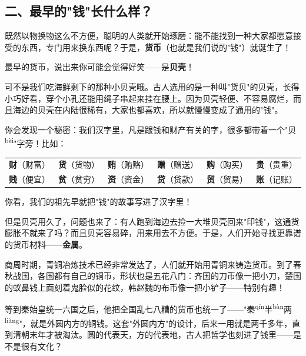 \documentclass[a4paper,12pt]{ctexart}
\newcommand{\ruby}[2]{#1\textsuperscript{#2}}
\begin{document}
\subsection*{二、最早的"钱"长什么样？}

既然以物换物这么不方便，聪明的人类就开始琢磨：能不能找到一种大家都愿意接受的东西，专门用来换东西呢？于是，\textbf{货币}（也就是我们说的"钱"）就诞生了！

最早的货币，说出来你可能会觉得好笑——是\textbf{贝壳}！

可不是我们吃海鲜剩下的那种小贝壳哦。古人选用的是一种叫"货贝"的贝壳，长得小巧好看，穿个小孔还能用绳子串起来挂在腰上。因为贝壳轻便、不容易腐烂，而且海边的贝壳在内陆很稀有，大家也都喜欢，所以就慢慢变成了通用的"钱"。

你会发现一个秘密：我们汉字里，凡是跟钱和财产有关的字，很多都带着一个"\ruby{贝}{bèi}"字旁！比如：

\begin{center}
\begin{tabular}{cccccc}
\textbf{财}（财富）& \textbf{货}（货物）& \textbf{贿}（贿赂）& \textbf{赠}（赠送）& \textbf{购}（购买）& \textbf{贵}（贵重）\\
\textbf{贱}（便宜）& \textbf{贫}（贫穷）& \textbf{资}（资金）& \textbf{贷}（贷款）& \textbf{贸}（贸易）& \textbf{账}（记账）\\
\end{tabular}
\end{center}

你看，我们的祖先早就把"钱"的故事写进了汉字里！

但是贝壳用久了，问题也来了：有人跑到海边去捡一大堆贝壳回来"印钱"，这通货膨胀不就来了吗？而且贝壳容易碎，用来用去不方便。于是，人们开始寻找更靠谱的货币材料——\textbf{金属}。

商周时期，青铜冶炼技术已经非常发达了，人们就开始用青铜来铸造货币。到了春秋战国，各国都有自己的铜币，形状也是五花八门：齐国的刀币像一把小刀，楚国的蚁鼻钱上面刻着鬼脸似的花纹，韩赵魏的布币像一把小铲子——特别有趣！

\begin{center}
\end{center}

等到秦始皇统一六国之后，他把全国乱七八糟的货币也统一了——"\ruby{秦}{qín}\ruby{半}{bàn}\ruby{两}{liǎng}"，就是外圆内方的铜钱。这套"外圆内方"的设计，后来一用就是两千多年，直到清朝末年才被淘汰。圆的代表天，方的代表地，古人把哲学也刻进了钱里——是不是很有文化？
\end{document}
